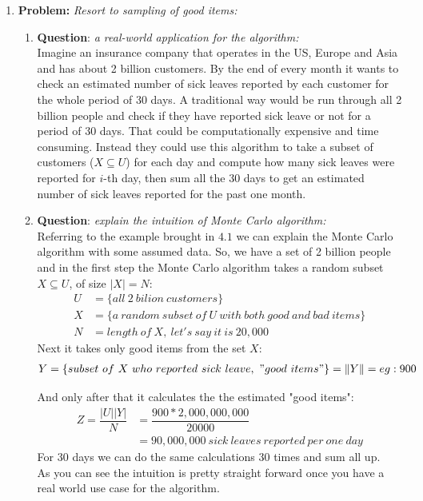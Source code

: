 \documentclass[11pt,a4paper,english]{article}
\begin{document}
\begin{enumerate}
\begin{enumerate}
        \end{enumerate}

      \item \textbf{Problem:} \textit{Resort to sampling of good items:}
        \begin{enumerate}
          \item \textbf{Question}: \textit{a real-world application for the algorithm:} \\
            Imagine an insurance company that operates in the US, Europe and Asia and has about 2 billion customers. By the end of every month it wants to check an estimated number of sick leaves reported by each customer for the whole period of 30 days. A traditional way would be run through all 2 billion people and check if they have reported sick leave or not for a period of 30 days. That could be computationally expensive and time consuming. Instead they could use this algorithm to take a subset of customers ($X \subseteq U$) for each day and compute how many sick leaves were reported for $i$-th day, then sum all the 30 days to get an estimated number of sick leaves reported for the past one month.\\

          \item \textbf{Question}: \textit{explain the intuition of Monte Carlo algorithm:} \\
            Referring to the example brought in $4.1$ we can explain the Monte Carlo algorithm with some assumed data. So, we have a set of 2 billion people and in the first step the Monte Carlo algorithm takes a random subset $X \subseteq U$, of size $|X|= N$:
            \begin{align*}
              U & = \{ all \ 2 \ bilion \ customers \}  \\
              X & = \{ a \ random \ subset \ of \ U \ with \ both \ good \ and \ bad \ items \} \\
              N & = length \ of \ X, \ let's \ say \ it \ is \ 20,000
            \end{align*}
            Next it takes only good items from the set $X$:
            \begin{align*}
              Y = \{ subset \ of \ X \ who \ reported \ sick \ leave, \ "good \ items" \} = \|Y\| = eg: 900
            \end{align*}

            And only after that it calculates the the estimated "good items":
            \begin{align*}
              Z = \dfrac{ |U||Y|}{N} & = \dfrac{900 * 2,000,000,000}{20000} \\
                                     & = 90,000,000 \ sick \ leaves \ reported \ per \ one \ day
            \end{align*}
            For 30 days we can do the same calculations 30 times and sum all up. \\
            As you can see the intuition is pretty straight forward once you have a real world use case for the algorithm.


\end{enumerate}
\end{enumerate}
\end{document}

